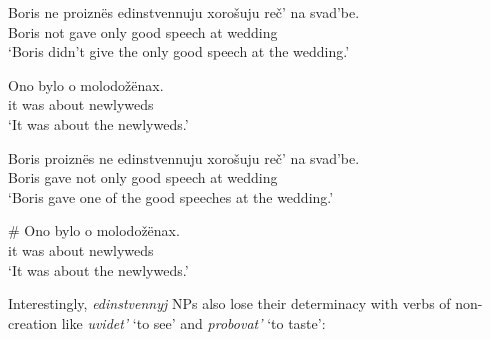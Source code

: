 \begin{exe}
	\ex \begin{xlist}
		\ex \gll Boris ne proizn\"{e}s edinstvennuju xoro\v{s}uju re\v{c}' na svad'be.\\
		Boris not gave only good speech at wedding\\
		\glt `Boris didn't give the only good speech at the wedding.'

		\ex \gll Ono bylo o molodo\v{z}\"{e}nax.\\
		it was about newlyweds\\
		\glt `It was about the newlyweds.'
	\end{xlist}

	\ex \label{boris3} \begin{xlist}
		\ex \gll Boris proizn\"{e}s ne edinstvennuju xoro\v{s}uju re\v{c}' na svad'be.\\
		Boris gave not only good speech at wedding\\
		\glt `Boris gave one of the good speeches at the wedding.'

		\ex \gll \# Ono bylo o molodo\v{z}\"{e}nax.\\
		{} it was about newlyweds\\
		\glt `It was about the newlyweds.'
	\end{xlist}
\end{exe}

Interestingly, \textit{edinstvennyj} NPs also lose their determinacy with verbs of non-creation like \textit{uvidet'} `to see' and \textit{probovat'} `to taste':

